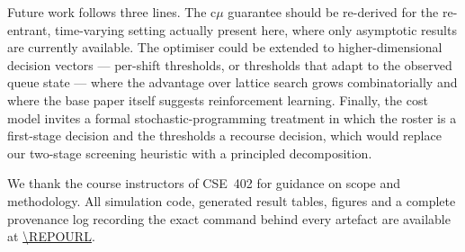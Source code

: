 \documentclass[sigconf,nonacm]{acmart}
\begin{document}
Future work follows three lines. The c$\mu$ guarantee should be re-derived for
the re-entrant, time-varying setting actually present here, where only
asymptotic results are currently available. The optimiser could be extended to
higher-dimensional decision vectors --- per-shift thresholds, or thresholds that
adapt to the observed queue state --- where the advantage over lattice search
grows combinatorially and where the base paper itself suggests reinforcement
learning. Finally, the cost model invites a formal stochastic-programming
treatment in which the roster is a first-stage decision and the thresholds a
recourse decision, which would replace our two-stage screening heuristic with a
principled decomposition.

\begin{acks}
We thank the course instructors of CSE~402 for guidance on scope and
methodology. All simulation code, generated result tables, figures and a
complete provenance log recording the exact command behind every artefact are
available at \url{\REPOURL}.
\end{acks}



\end{document}
